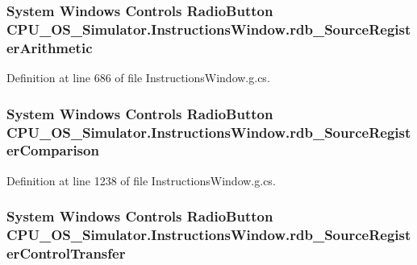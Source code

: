 \subsubsection[{rdb\+\_\+\+Source\+Register\+Arithmetic}]{\setlength{\rightskip}{0pt plus 5cm}System Windows Controls Radio\+Button C\+P\+U\+\_\+\+O\+S\+\_\+\+Simulator.\+Instructions\+Window.\+rdb\+\_\+\+Source\+Register\+Arithmetic\hspace{0.3cm}{\ttfamily [package]}}\label{class_c_p_u___o_s___simulator_1_1_instructions_window_ad571b65d5fe87bdb079c807dcac0680f}


Definition at line 686 of file Instructions\+Window.\+g.\+cs.

\hypertarget{class_c_p_u___o_s___simulator_1_1_instructions_window_afa2620b93d7d354b0632d7c290022545}{}
\subsubsection[{rdb\+\_\+\+Source\+Register\+Comparison}]{\setlength{\rightskip}{0pt plus 5cm}System Windows Controls Radio\+Button C\+P\+U\+\_\+\+O\+S\+\_\+\+Simulator.\+Instructions\+Window.\+rdb\+\_\+\+Source\+Register\+Comparison\hspace{0.3cm}{\ttfamily [package]}}\label{class_c_p_u___o_s___simulator_1_1_instructions_window_afa2620b93d7d354b0632d7c290022545}


Definition at line 1238 of file Instructions\+Window.\+g.\+cs.

\hypertarget{class_c_p_u___o_s___simulator_1_1_instructions_window_a63fea6d97a26f4ed71753209dac85d24}{}
\subsubsection[{rdb\+\_\+\+Source\+Register\+Control\+Transfer}]{\setlength{\rightskip}{0pt plus 5cm}System Windows Controls Radio\+Button C\+P\+U\+\_\+\+O\+S\+\_\+\+Simulator.\+Instructions\+Window.\+rdb\+\_\+\+Source\+Register\+Control\+Transfer\hspace{0.3cm}{\ttfamily [package]}}\label{class_c_p_u___o_s___simulator_1_1_instructions_window_a63fea6d97a26f4ed71753209dac85d24}


